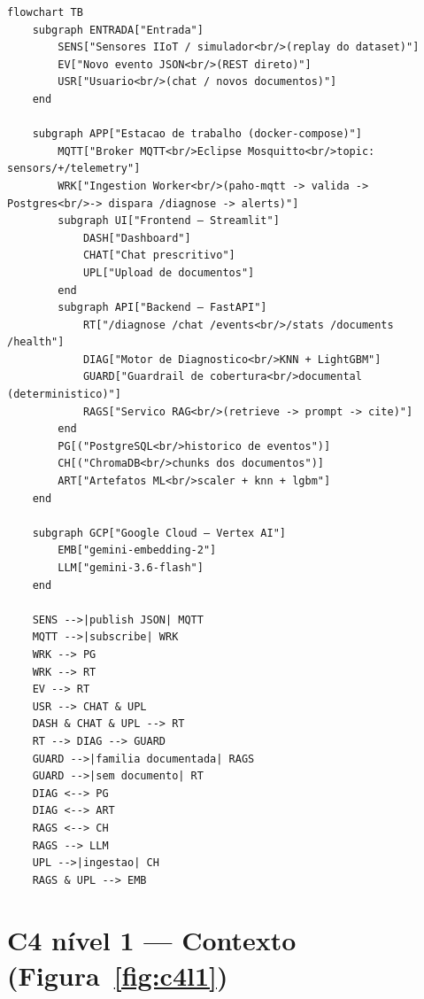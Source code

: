 \begin{lstlisting}[language=mermaid, caption={Visão geral --- fluxo completo entre entrada, aplicação e nuvem}, label={lst:mmvisao}]
flowchart TB
    subgraph ENTRADA["Entrada"]
        SENS["Sensores IIoT / simulador<br/>(replay do dataset)"]
        EV["Novo evento JSON<br/>(REST direto)"]
        USR["Usuario<br/>(chat / novos documentos)"]
    end

    subgraph APP["Estacao de trabalho (docker-compose)"]
        MQTT["Broker MQTT<br/>Eclipse Mosquitto<br/>topic: sensors/+/telemetry"]
        WRK["Ingestion Worker<br/>(paho-mqtt -> valida -> Postgres<br/>-> dispara /diagnose -> alerts)"]
        subgraph UI["Frontend — Streamlit"]
            DASH["Dashboard"]
            CHAT["Chat prescritivo"]
            UPL["Upload de documentos"]
        end
        subgraph API["Backend — FastAPI"]
            RT["/diagnose /chat /events<br/>/stats /documents /health"]
            DIAG["Motor de Diagnostico<br/>KNN + LightGBM"]
            GUARD["Guardrail de cobertura<br/>documental (deterministico)"]
            RAGS["Servico RAG<br/>(retrieve -> prompt -> cite)"]
        end
        PG[("PostgreSQL<br/>historico de eventos")]
        CH[("ChromaDB<br/>chunks dos documentos")]
        ART["Artefatos ML<br/>scaler + knn + lgbm"]
    end

    subgraph GCP["Google Cloud — Vertex AI"]
        EMB["gemini-embedding-2"]
        LLM["gemini-3.6-flash"]
    end

    SENS -->|publish JSON| MQTT
    MQTT -->|subscribe| WRK
    WRK --> PG
    WRK --> RT
    EV --> RT
    USR --> CHAT & UPL
    DASH & CHAT & UPL --> RT
    RT --> DIAG --> GUARD
    GUARD -->|familia documentada| RAGS
    GUARD -->|sem documento| RT
    DIAG <--> PG
    DIAG <--> ART
    RAGS <--> CH
    RAGS --> LLM
    UPL -->|ingestao| CH
    RAGS & UPL --> EMB
\end{lstlisting}

\section{C4 nível 1 --- Contexto (Figura~\ref{fig:c4l1})}

